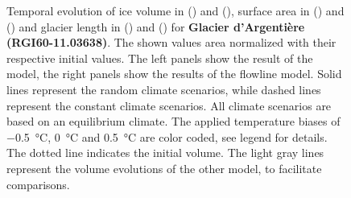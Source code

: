 \begin{figure}[p]
  \caption{Temporal evolution of ice volume in () and (), surface area in () and () and glacier length in () and () for \textbf{Glacier d'Argentière (RGI60-11.03638)}. The shown values area normalized with their respective initial values. The left panels show the result of the \vas{} model, the right panels show the results of the flowline model. Solid lines represent the random climate scenarios, while dashed lines represent the constant climate scenarios. All climate scenarios are based on an equilibrium climate. The applied temperature biases of \SI{-.5}{\celsius}, \SI{0}{\celsius} and \SI{+.5}{\celsius} are color coded, see legend for details. The dotted line indicates the initial volume. The light gray lines represent the volume evolutions of the other model, to facilitate comparisons.}
  \label{fig:Glacier_d_Argentiere}
\end{figure}

